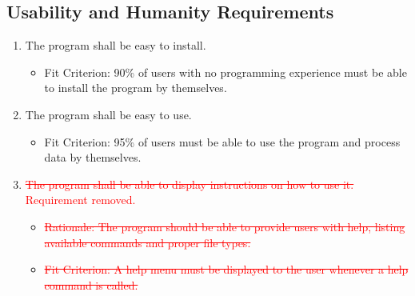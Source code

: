 \documentclass[12pt, titlepage]{article}
\begin{document}
\subsection{Usability and Humanity Requirements}
\begin{enumerate}[{UH}1. ]
\item \label{UH1} The program shall be easy to install.
    \begin{itemize}
        \item Fit Criterion: 90\% of users with no programming experience must be able to install the program by themselves.
\end{itemize}
\item \label{UH2} The program shall be easy to use.
    \begin{itemize}
        \item Fit Criterion: 95\% of users must be able to use the program and process data by themselves.
\end{itemize}
\item \label{UH3} {\textcolor{red}{\sout{The program shall be able to display instructions on how to use it.} Requirement removed.}}
    \begin{itemize} 
        \item {\textcolor{red}{\sout{Rationale: The program should be able to provide users with help, listing available commands and proper file types.}}}
        \item {\textcolor{red}{\sout{Fit Criterion: A help menu must be displayed to the user whenever a help command is called.}}}
\end{itemize}
\end{enumerate}
\end{document}
